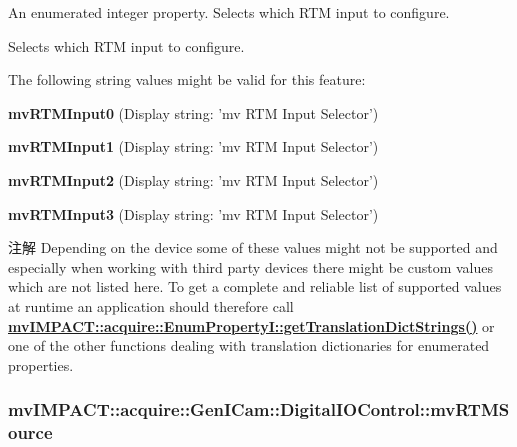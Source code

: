 An enumerated integer property. Selects which R\+T\+M input to configure. 

Selects which R\+T\+M input to configure.

The following string values might be valid for this feature\+:
\begin{DoxyItemize}
\item {\bfseries mv\+R\+T\+M\+Input0} (Display string\+: 'mv R\+T\+M Input Selector')
\item {\bfseries mv\+R\+T\+M\+Input1} (Display string\+: 'mv R\+T\+M Input Selector')
\item {\bfseries mv\+R\+T\+M\+Input2} (Display string\+: 'mv R\+T\+M Input Selector')
\item {\bfseries mv\+R\+T\+M\+Input3} (Display string\+: 'mv R\+T\+M Input Selector')
\end{DoxyItemize}

\begin{DoxyNote}{注解}
Depending on the device some of these values might not be supported and especially when working with third party devices there might be custom values which are not listed here. To get a complete and reliable list of supported values at runtime an application should therefore call {\bfseries \hyperlink{classmv_i_m_p_a_c_t_1_1acquire_1_1_enum_property_i_a0ba6ccbf5ee69784d5d0b537924d26b6}{mv\+I\+M\+P\+A\+C\+T\+::acquire\+::\+Enum\+Property\+I\+::get\+Translation\+Dict\+Strings()}} or one of the other functions dealing with translation dictionaries for enumerated properties. 
\end{DoxyNote}
\hypertarget{classmv_i_m_p_a_c_t_1_1acquire_1_1_gen_i_cam_1_1_digital_i_o_control_afbac9e850186a10d255032480059c308}{
\subsubsection[{mv\+R\+T\+M\+Source}]{ mv\+I\+M\+P\+A\+C\+T\+::acquire\+::\+Gen\+I\+Cam\+::\+Digital\+I\+O\+Control\+::mv\+R\+T\+M\+Source}}\label{classmv_i_m_p_a_c_t_1_1acquire_1_1_gen_i_cam_1_1_digital_i_o_control_afbac9e850186a10d255032480059c308}


